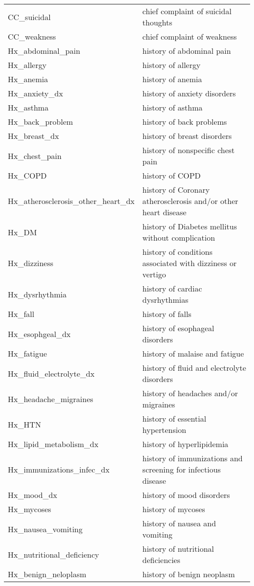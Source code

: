 \begin{tabular}{ll}
CC\_suicidal & chief complaint of suicidal thoughts \\
CC\_weakness & chief complaint of weakness \\
Hx\_abdominal\_pain & history of abdominal pain \\
Hx\_allergy & history of allergy \\
Hx\_anemia & history of anemia \\
Hx\_anxiety\_dx & history of anxiety disorders \\
Hx\_asthma & history of asthma \\
Hx\_back\_problem & history of back problems \\
Hx\_breast\_dx & history of breast disorders \\
Hx\_chest\_pain & history of nonspecific chest pain \\
Hx\_COPD & history of COPD \\
Hx\_atherosclerosis\_other\_heart\_dx & history of Coronary atherosclerosis and/or other heart disease \\
Hx\_DM & history of Diabetes mellitus without complication \\
Hx\_dizziness & history of conditions associated with dizziness or vertigo \\
Hx\_dysrhythmia & history of cardiac dysrhythmias \\
Hx\_fall & history of falls \\
Hx\_esophgeal\_dx & history of esophageal disorders \\
Hx\_fatigue & history of malaise and fatigue \\
Hx\_fluid\_electrolyte\_dx & history of fluid and electrolyte disorders \\
Hx\_headache\_migraines & history of headaches and/or migraines \\
Hx\_HTN & history of essential hypertension \\
Hx\_lipid\_metabolism\_dx & history of hyperlipidemia \\
Hx\_immunizations\_infec\_dx & history of immunizations and screening for infectious disease \\
Hx\_mood\_dx & history of mood disorders \\
Hx\_mycoses & history of mycoses \\
Hx\_nausea\_vomiting & history of nausea and vomiting \\
Hx\_nutritional\_deficiency & history of nutritional deficiencies \\
Hx\_benign\_neloplasm & history of benign neoplasm \\

\end{tabular}
